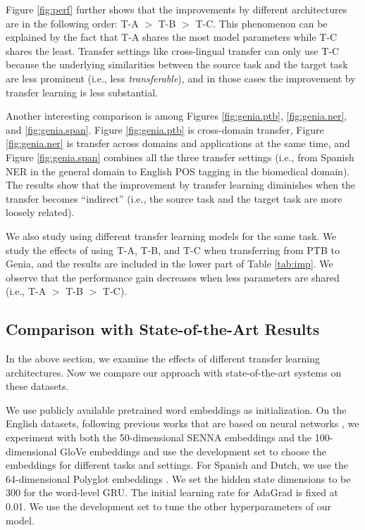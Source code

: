 \documentclass{article} \usepackage{iclr2017_conference,times}
\begin{document}
Figure \ref{fig:perf} further shows that the improvements by different architectures are in the following order: T-A $>$ T-B $>$ T-C. This phenomenon can be explained by the fact that T-A shares the most model parameters while T-C shares the least. 
Transfer settings like cross-lingual transfer can only use T-C because the underlying similarities between the source task and the target task are less prominent (i.e., less \textit{transferable}), and in those cases the improvement by transfer learning is less substantial.

Another interesting comparison is among Figures \ref{fig:genia.ptb}, \ref{fig:genia.ner}, and \ref{fig:genia.span}. Figure \ref{fig:genia.ptb} is cross-domain transfer, Figure \ref{fig:genia.ner} is transfer across domains and applications at the same time, and Figure \ref{fig:genia.span} combines all the three transfer settings (i.e., from Spanish NER in the general domain to English POS tagging in the biomedical domain). The results show that the improvement by transfer learning diminishes when the transfer becomes ``indirect'' (i.e., the source task and the target task are more loosely related).

We also study using different transfer learning models for the same task. We study the effects of using T-A, T-B, and T-C when transferring from PTB to Genia, and the results are included in the lower part of Table \ref{tab:imp}. We observe that the performance gain decreases when less parameters are shared (i.e., T-A $>$ T-B $>$ T-C).

\subsection{Comparison with State-of-the-Art Results}

In the above section, we examine the effects of different transfer learning architectures. Now we compare our approach with state-of-the-art systems on these datasets.

We use publicly available pretrained word embeddings as initialization. On the English datasets, following previous works that are based on neural networks \citep{collobert2011natural,huang2015bidirectional,chiu2015named,ma2016end}, we experiment with both the 50-dimensional SENNA embeddings \citep{collobert2011natural} and the 100-dimensional GloVe embeddings \citep{pennington2014glove} and use the development set to choose the embeddings for different tasks and settings. For Spanish and Dutch, we use the 64-dimensional Polyglot embeddings \citep{al2013polyglot}. We set the hidden state dimensions to be 300 for the word-level GRU. The initial learning rate for AdaGrad is fixed at 0.01. We use the development set to tune the other hyperparameters of our model. 
\end{document}
